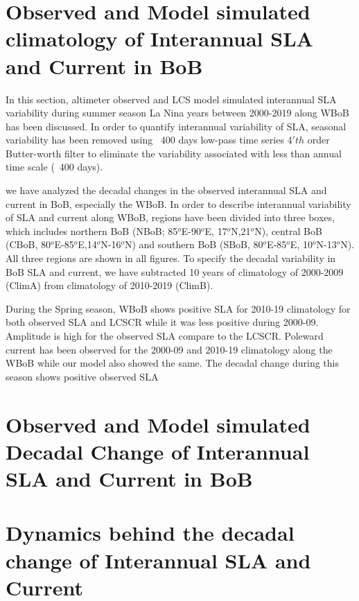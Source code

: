 \documentclass[review]{elsarticle}
\begin{document}
\section{Observed and Model simulated climatology of Interannual SLA and Current in BoB} %
In this section, altimeter observed and LCS model simulated interannual SLA variability during summer season La Nina years between 2000-2019 along WBoB has been discussed. In order to quantify interannual variability of SLA, seasonal variability has been removed using ~400 days low-pass time series 4$'th$ order Butter-worth filter to eliminate the variability associated with less than annual time scale (~400 days).

we have analyzed the decadal changes in the observed interannual SLA and current in BoB, especially the WBoB. In order to describe interannual variability of SLA and current along WBoB, regions have been divided into three boxes, which includes northern BoB (NBoB; 85$^o$E-90$^o$E, 17$^o$N,21$^o$N), central BoB (CBoB, 80$^o$E-85$^o$E,14$^o$N-16$^o$N) and southern BoB (SBoB, 80$^o$E-85$^o$E, 10$^o$N-13$^o$N). All three regions are shown in all figures. To specify the decadal variability in BoB SLA and current, we have subtracted 10 years of climatology of 2000-2009 (ClimA) from climatology of 2010-2019 (ClimB).

During the Spring season, WBoB shows positive SLA for 2010-19 climatology for both observed SLA and LCSCR while it was less positive during 2000-09. Amplitude is high for the observed SLA compare to the LCSCR. Poleward current has been observed for the 2000-09 and 2010-19 climatology along the WBoB while our model also showed the same. The decadal change during this season shows positive observed SLA 

\section{Observed and Model simulated Decadal Change of Interannual SLA and Current in BoB} %

\section{Dynamics behind the decadal change of Interannual SLA and Current}
\end{document}
